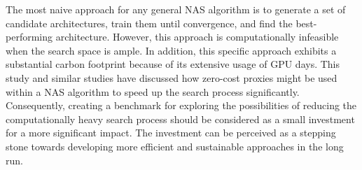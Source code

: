 The most naive approach for any general \gls{NAS} algorithm is to generate a set of candidate architectures, train them until convergence, and find the best-performing architecture. However, this approach is computationally infeasible when the search space is ample. In addition, this specific approach exhibits a substantial carbon footprint because of its extensive usage of \gls{GPU} days. This study and similar studies \autocite{abdelfattah2021zero, colin2022adeeperlook} have discussed how zero-cost proxies might be used within a \gls{NAS} algorithm to speed up the search process significantly. Consequently, creating a benchmark for exploring the possibilities of reducing the computationally heavy search process should be considered as a small investment for a more significant impact. The investment can be perceived as a stepping stone towards developing more efficient and sustainable approaches in the long run.
